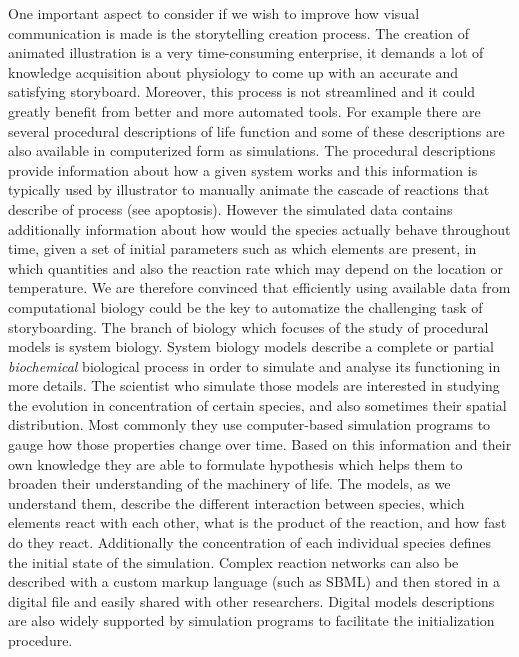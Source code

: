 One important aspect to consider if we wish to improve how visual communication is made is the storytelling creation process.
The creation of animated illustration is a very time-consuming enterprise, it demands a lot of knowledge acquisition about physiology to come up with an accurate and satisfying storyboard.
Moreover, this process is not streamlined and it could greatly benefit from better and more automated tools.
For example there are several procedural descriptions of life function and some of these descriptions are also available in computerized form as simulations.
The procedural descriptions provide information about how a given system works and this information is typically used by illustrator to manually animate the cascade of reactions that describe of process (see apoptosis).
However the simulated data contains additionally information about how would the species actually behave throughout time, given a set of initial parameters such as which elements are present, in which quantities and also the reaction rate which may depend on the location or temperature.
We are therefore convinced that efficiently using available data from computational biology could be the key to automatize the challenging task of storyboarding.
The branch of biology which focuses of the study of procedural models is system biology.
System biology models describe a complete or partial \textit{biochemical} biological process in order to simulate and analyse its functioning in more details.
The scientist who simulate those models are interested in studying the evolution in concentration of certain species, and also sometimes their spatial distribution.
Most commonly they use computer-based simulation programs to gauge how those properties change over time.
Based on this information and their own knowledge they are able to formulate hypothesis which helps them to broaden their understanding of the machinery of life. 
The models, as we understand them, describe the different interaction between species, which elements react with each other, what is the product of the reaction, and how fast do they react.
Additionally the concentration of each individual species defines the initial state of the simulation.
Complex reaction networks can also be described with a custom markup language (such as SBML) and then stored in a digital file and easily shared with other researchers.
Digital models descriptions are also widely supported by simulation programs to facilitate the initialization procedure.


